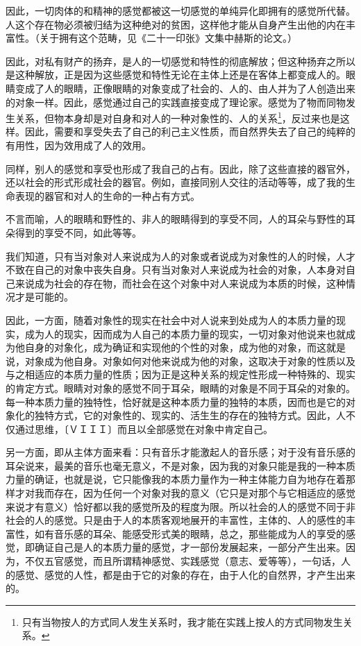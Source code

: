 \documentclass[a4paper,twoside,12pt]{ctexart}
\begin{document}
因此，一切肉体的和精神的感觉都被这一切感觉的单纯异化即拥有的感觉所代替。人这个存在物必须被归结为这种绝对的贫困，这样他才能从自身产生出他的内在丰富性。（关于拥有这个范畴，见《二十一印张》文集中赫斯的论文。）

因此，对私有财产的扬弃，是人的一切感觉和特性的彻底解放；但这种扬弃之所以是这种解放，正是因为这些感觉和特性无论在主体上还是在客体上都变成人的。眼睛变成了人的眼睛，正像眼睛的对象变成了社会的、人的、由人并为了人创造出来的对象一样。因此，感觉通过自己的实践直接变成了理论家。感觉为了物而同物发生关系，但物本身却是对自身和对人的一种对象性的、人的关系\footnote{只有当物按人的方式同人发生关系时，我才能在实践上按人的方式同物发生关系。}，反过来也是这样。因此，需要和享受失去了自己的利己主义性质，而自然界失去了自己的纯粹的有用性，因为效用成了人的效用。

同样，别人的感觉和享受也形成了我自己的占有。因此，除了这些直接的器官外，还以社会的形式形成社会的器官。例如，直接同别人交往的活动等等，成了我的生命表现的器官和对人的生命的一种占有方式。

不言而喻，人的眼睛和野性的、非人的眼睛得到的享受不同，人的耳朵与野性的耳朵得到的享受不同，如此等等。

我们知道，只有当对象对人来说成为人的对象或者说成为对象性的人的时候，人才不致在自己的对象中丧失自身。只有当对象对人来说成为社会的对象，人本身对自己来说成为社会的存在物，而社会在这个对象中对人来说成为本质的时候，这种情况才是可能的。

因此，一方面，随着对象性的现实在社会中对人说来到处成为人的本质力量的现实，成为人的现实，因而成为人自己的本质力量的现实，一切对象对他说来也就成为他自身的对象化，成为确证和实现他的个性的对象，成为他的对象，而这就是说，对象成为他自身。对象如何对他来说成为他的对象，这取决于对象的性质以及与之相适应的本质力量的性质；因为正是这种关系的规定性形成一种特殊的、现实的肯定方式。眼睛对对象的感觉不同于耳朵，眼睛的对象是不同于耳朵的对象的。每一种本质力量的独特性，恰好就是这种本质力量的独特的本质，因而也是它的对象化的独特方式，它的对象性的、现实的、活生生的存在的独特方式。因此，人不仅通过思维，〔ＶＩＩＩ〕而且以全部感觉在对象中肯定自己。

另一方面，即从主体方面来看：只有音乐才能激起人的音乐感；对于没有音乐感的耳朵说来，最美的音乐也毫无意义，不是对象，因为我的对象只能是我的一种本质力量的确证，也就是说，它只能像我的本质力量作为一种主体能力自为地存在着那样才对我而存在，因为任何一个对象对我的意义（它只是对那个与它相适应的感觉来说才有意义）恰好都以我的感觉所及的程度为限。所以社会的人的感觉不同于非社会的人的感觉。只是由于人的本质客观地展开的丰富性，主体的、人的感性的丰富性，如有音乐感的耳朵、能感受形式美的眼睛，总之，那些能成为人的享受的感觉，即确证自己是人的本质力量的感觉，才一部份发展起来，一部分产生出来。因为，不仅五官感觉，而且所谓精神感觉、实践感觉（意志、爱等等），一句话，人的感觉、感觉的人性，都是由于它的对象的存在，由于人化的自然界，才产生出来的。
\end{document}
